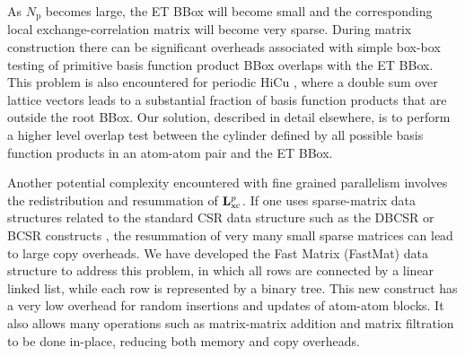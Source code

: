 \commentoutA{\documentclass[prb,aps,twocolumn,twocolumngrid]{revtex4}}
\newcommand{\Np}{N_{\mathrm{p}}} \newcommand{\Nbox}{N_{\mathrm{b}}}
\begin{document}

As $\Np$ becomes large, the ET BBox will become small and the
corresponding local exchange-correlation matrix will become very
sparse.  During matrix construction there can be significant overheads
associated with simple box-box testing of primitive basis function
product BBox overlaps with the ET BBox.  This problem is also
encountered for periodic HiCu \cite{CTymczak02}, where a double sum
over lattice vectors leads to a substantial fraction of basis function
products that are outside the root BBox.  Our solution, described in
detail elsewhere, is to perform a higher level overlap test between
the cylinder defined by all possible basis function products in an
atom-atom pair and the ET BBox.

Another potential complexity encountered with fine grained parallelism
involves the redistribution and resummation of ${\bf
L}_{\mathrm{xc}}^{p}$.  If one uses sparse-matrix data structures
related to the standard CSR \cite{FGustavson78,SPissanetzky84} data
structure such as the DBCSR or BCSR constructs \cite{MChallacombe00B},
the resummation of very many small sparse matrices can lead to large
copy overheads.  We have developed the Fast Matrix (FastMat) data
structure to address this problem, in which all rows are connected by
a linear linked list, while each row is represented by a binary tree.
This new construct has a very low overhead for random insertions and
updates of atom-atom blocks.  It also allows many operations such as
matrix-matrix addition and matrix filtration to be done in-place,
reducing both memory and copy overheads.
\end{document}
